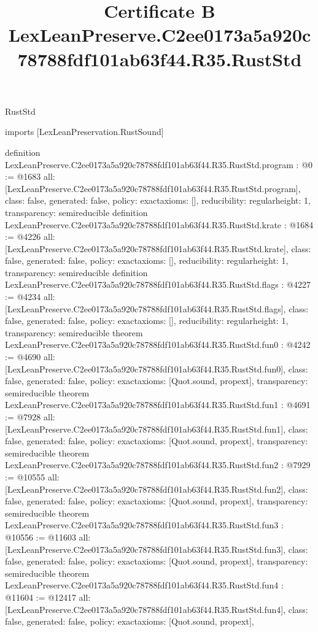 \begin{lexlean}{RustStd}
\title{Certificate B LexLeanPreserve.C2ee0173a5a920c78788fdf101ab63f44.R35.RustStd}
\begin{coremodule}
imports [LexLeanPreservation.RustSound]

definition LexLeanPreserve.C2ee0173a5a920c78788fdf101ab63f44.R35.RustStd.program : @0 := @1683 {
  all: [LexLeanPreserve.C2ee0173a5a920c78788fdf101ab63f44.R35.RustStd.program],
  class: false,
  generated: false,
  policy: exact{axioms: []},
  reducibility: regular{height: 1},
  transparency: semireducible
}
definition LexLeanPreserve.C2ee0173a5a920c78788fdf101ab63f44.R35.RustStd.krate : @1684 := @4226 {
  all: [LexLeanPreserve.C2ee0173a5a920c78788fdf101ab63f44.R35.RustStd.krate],
  class: false,
  generated: false,
  policy: exact{axioms: []},
  reducibility: regular{height: 1},
  transparency: semireducible
}
definition LexLeanPreserve.C2ee0173a5a920c78788fdf101ab63f44.R35.RustStd.flags : @4227 := @4234 {
  all: [LexLeanPreserve.C2ee0173a5a920c78788fdf101ab63f44.R35.RustStd.flags],
  class: false,
  generated: false,
  policy: exact{axioms: []},
  reducibility: regular{height: 1},
  transparency: semireducible
}
theorem LexLeanPreserve.C2ee0173a5a920c78788fdf101ab63f44.R35.RustStd.fun0 : @4242 := @4690 {
  all: [LexLeanPreserve.C2ee0173a5a920c78788fdf101ab63f44.R35.RustStd.fun0],
  class: false,
  generated: false,
  policy: exact{axioms: [Quot.sound, propext]},
  transparency: semireducible
}
theorem LexLeanPreserve.C2ee0173a5a920c78788fdf101ab63f44.R35.RustStd.fun1 : @4691 := @7928 {
  all: [LexLeanPreserve.C2ee0173a5a920c78788fdf101ab63f44.R35.RustStd.fun1],
  class: false,
  generated: false,
  policy: exact{axioms: [Quot.sound, propext]},
  transparency: semireducible
}
theorem LexLeanPreserve.C2ee0173a5a920c78788fdf101ab63f44.R35.RustStd.fun2 : @7929 := @10555 {
  all: [LexLeanPreserve.C2ee0173a5a920c78788fdf101ab63f44.R35.RustStd.fun2],
  class: false,
  generated: false,
  policy: exact{axioms: [Quot.sound, propext]},
  transparency: semireducible
}
theorem LexLeanPreserve.C2ee0173a5a920c78788fdf101ab63f44.R35.RustStd.fun3 : @10556 := @11603 {
  all: [LexLeanPreserve.C2ee0173a5a920c78788fdf101ab63f44.R35.RustStd.fun3],
  class: false,
  generated: false,
  policy: exact{axioms: [Quot.sound, propext]},
  transparency: semireducible
}
theorem LexLeanPreserve.C2ee0173a5a920c78788fdf101ab63f44.R35.RustStd.fun4 : @11604 := @12417 {
  all: [LexLeanPreserve.C2ee0173a5a920c78788fdf101ab63f44.R35.RustStd.fun4],
  class: false,
  generated: false,
  policy: exact{axioms: [Quot.sound, propext]},
}
\end{coremodule}
\end{lexlean}
